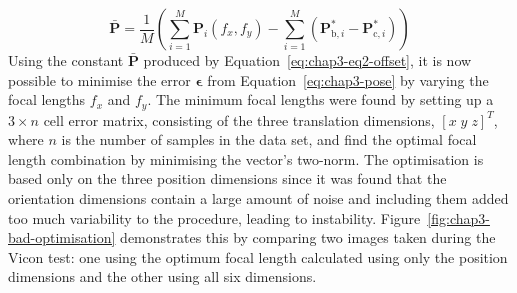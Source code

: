 \begin{equation}
  \label{eq:chap3-eq2-offset}
  \bar{\bm{P}} = \frac{1}{M} \left (\sum\limits_{i=1}^M \bm{P}_i(f_x, f_y) - \sum\limits_{i=1}^M(\bm{P}^*_{\mathrm{b},i} - \bm{P}^*_{\mathrm{c}, i})\right)
\end{equation}
Using the constant $\bar{\bm{P}}$ produced by Equation~\ref{eq:chap3-eq2-offset}, it is now possible to minimise the error $\bm{\epsilon}$ from Equation~\ref{eq:chap3-pose} by varying the focal lengths $f_x$ and $f_y$. The minimum focal lengths were found by setting up a $3\times n$ cell error matrix, consisting of the three translation dimensions, ${[x\;y\;z]}^T$, where $n$ is the number of samples in the data set, and find the optimal focal length combination by minimising the vector's two-norm. The optimisation is based only on the three position dimensions since it was found that the orientation dimensions contain a large amount of noise and including them added too much variability to the procedure, leading to instability. Figure~\ref{fig:chap3-bad-optimisation} demonstrates this by comparing two images taken during the Vicon test: one using the optimum focal length calculated using only the position dimensions and the other using all six dimensions. 

